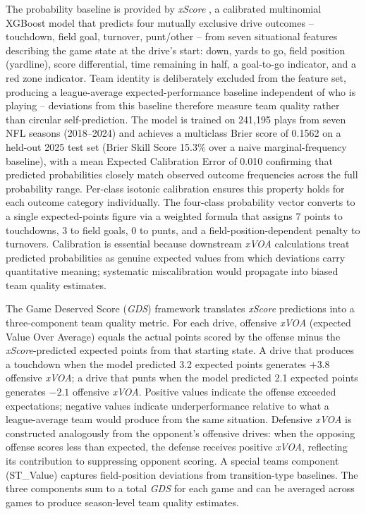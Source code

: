 \documentclass[12pt,a4paper]{article}
\newcommand{\xscore}{\textit{xScore}}
\newcommand{\xvoa}{\textit{xVOA}}
\newcommand{\gds}{\textit{GDS}}
\begin{document}
The probability baseline is provided by \xscore{} \citep{mecha2026xscore-model}, a calibrated multinomial XGBoost model that predicts four mutually exclusive drive outcomes -- touchdown, field goal, turnover, punt/other -- from seven situational features describing the game state at the drive's start: down, yards to go, field position (yardline), score differential, time remaining in half, a goal-to-go indicator, and a red zone indicator. Team identity is deliberately excluded from the feature set, producing a league-average expected-performance baseline independent of who is playing -- deviations from this baseline therefore measure team quality rather than circular self-prediction. The model is trained on 241,195 plays from seven NFL seasons (2018--2024) and achieves a multiclass Brier score of 0.1562 on a held-out 2025 test set (Brier Skill Score 15.3\% over a naive marginal-frequency baseline), with a mean Expected Calibration Error of 0.010 confirming that predicted probabilities closely match observed outcome frequencies across the full probability range. Per-class isotonic calibration ensures this property holds for each outcome category individually. The four-class probability vector converts to a single expected-points figure via a weighted formula that assigns 7 points to touchdowns, 3 to field goals, 0 to punts, and a field-position-dependent penalty to turnovers. Calibration is essential because downstream \xvoa{} calculations treat predicted probabilities as genuine expected values from which deviations carry quantitative meaning; systematic miscalibration would propagate into biased team quality estimates.

The Game Deserved Score (\gds{}) framework \citep{mecha2026gds} translates \xscore{} predictions into a three-component team quality metric. For each drive, offensive \xvoa{} (expected Value Over Average) equals the actual points scored by the offense minus the \xscore{}-predicted expected points from that starting state. A drive that produces a touchdown when the model predicted 3.2 expected points generates $+3.8$ offensive \xvoa{}; a drive that punts when the model predicted 2.1 expected points generates $-2.1$ offensive \xvoa{}. Positive values indicate the offense exceeded expectations; negative values indicate underperformance relative to what a league-average team would produce from the same situation. Defensive \xvoa{} is constructed analogously from the opponent's offensive drives: when the opposing offense scores less than expected, the defense receives positive \xvoa{}, reflecting its contribution to suppressing opponent scoring. A special teams component (ST\_Value) captures field-position deviations from transition-type baselines. The three components sum to a total \gds{} for each game and can be averaged across games to produce season-level team quality estimates.
\end{document}
